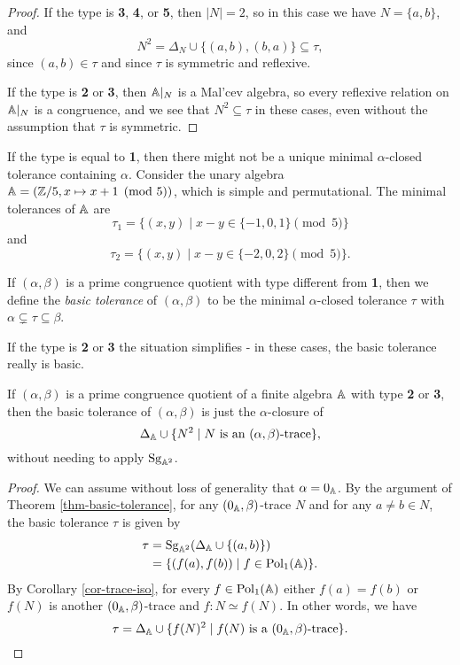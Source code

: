 \begin{appendices}
\begin{proof}
If the type is \textbf{3}, \textbf{4}, or \textbf{5}, then $|N| = 2$, so in this case we have $N = \{a,b\}$, and
\[
N^2 = \Delta_N \cup \{(a,b), (b,a)\} \subseteq \tau,
\]
since $(a,b) \in \tau$ and since $\tau$ is symmetric and reflexive.

If the type is \textbf{2} or \textbf{3}, then $\mathbb{A}|_N$ is a Mal'cev algebra, so every reflexive relation on $\mathbb{A}|_N$ is a congruence, and we see that $N^2 \subseteq \tau$ in these cases, even without the assumption that $\tau$ is symmetric.
\end{proof}

\begin{ex} If the type is equal to \textbf{1}, then there might not be a unique minimal $\alpha$-closed tolerance containing $\alpha$. Consider the unary algebra $\mathbb{A} = (\mathbb{Z}/5, x \mapsto x+1 \pmod{5})$, which is simple and permutational. The minimal tolerances of $\mathbb{A}$ are
\[
\tau_1 = \{(x,y) \mid x-y \in \{-1,0,1\} \pmod{5}\}
\]
and
\[
\tau_2 = \{(x,y) \mid x-y \in \{-2,0,2\} \pmod{5}\}.
\]
\end{ex}

\begin{defn} If $(\alpha,\beta)$ is a prime congruence quotient with type different from \textbf{1}, then we define the \emph{basic tolerance} of $(\alpha,\beta)$ to be the minimal $\alpha$-closed tolerance $\tau$ with $\alpha \subsetneq \tau \subseteq \beta$.
\end{defn}

If the type is \textbf{2} or \textbf{3} the situation simplifies - in these cases, the basic tolerance really is basic.

\begin{thm} If $(\alpha,\beta)$ is a prime congruence quotient of a finite algebra $\mathbb{A}$ with type \textbf{2} or \textbf{3}, then the basic tolerance of $(\alpha,\beta)$ is just the $\alpha$-closure of
\[
\Delta_{\mathbb{A}} \cup \{N^2 \mid N \text{ is an $(\alpha,\beta)$-trace}\},
\]
without needing to apply $\operatorname{Sg}_{\mathbb{A}^2}$.
\end{thm}
\begin{proof} We can assume without loss of generality that $\alpha = 0_{\mathbb{A}}$. By the argument of Theorem \ref{thm-basic-tolerance}, for any $(0_{\mathbb{A}},\beta)$-trace $N$ and for any $a \ne b \in N$, the basic tolerance $\tau$ is given by
\begin{align*}
\tau &= \operatorname{Sg}_{\mathbb{A}^2}(\Delta_{\mathbb{A}} \cup \{(a,b)\})\\
&= \{(f(a),f(b)) \mid f \in \operatorname{Pol}_1(\mathbb{A})\}.
\end{align*}
By Corollary \ref{cor-trace-iso}, for every $f \in \operatorname{Pol}_1(\mathbb{A})$ either $f(a) = f(b)$ or $f(N)$ is another $(0_{\mathbb{A}},\beta)$-trace and $f : N \simeq f(N)$. In other words, we have
\[
\tau = \Delta_{\mathbb{A}} \cup \{f(N)^2 \mid f(N) \text{ is a $(0_{\mathbb{A}},\beta)$-trace}\}.\qedhere
\]
\end{proof}


\end{appendices}

